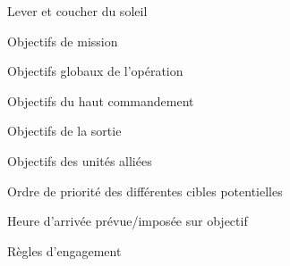 \begin{e1}
\begin{e2}
        \item Lever et coucher du soleil
    \end{e2}
    \item Objectifs de mission
    \begin{e2}
        \item Objectifs globaux de l’opération
        \item Objectifs du haut commandement
        \item Objectifs de la sortie
        \item Objectifs des unités alliées
        \item Ordre de priorité des différentes cibles potentielles
        \item Heure d’arrivée prévue/imposée sur objectif
        \item Règles d’engagement
    \end{e2}
\end{e1}




